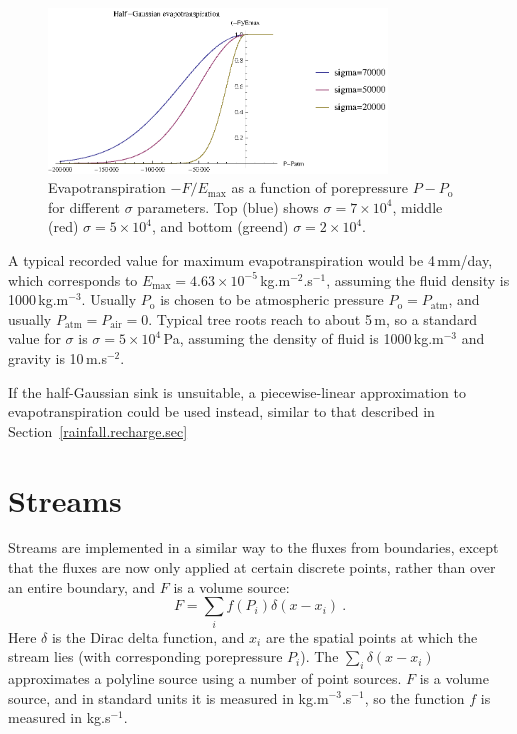 \documentclass[]{scrreprt}
\begin{document}
\begin{figure}[htb]
\centering
\includegraphics[width=9cm]{et.eps}
\caption{Evapotranspiration $-F/E_{\mathrm{max}}$ as a function of
  porepressure $P - P_{\mathrm{o}}$ for different $\sigma$ parameters.  Top (blue)
  shows $\sigma=7\times 10^{4}$, middle (red) $\sigma=5\times 10^{4}$,
  and bottom (greend) $\sigma=2\times 10^{4}$.}
\label{et.fig}
\end{figure}


A typical recorded value for maximum evapotranspiration would be
4\,mm/day, which corresponds to $E_{\mathrm{max}} = 4.63\times
10^{-5}$\,kg.m$^{-2}$.s$^{-1}$, assuming the fluid density is
1000\,kg.m$^{-3}$.  Usually $P_{\mathrm{o}}$ is chosen to be atmospheric
pressure $P_{\mathrm{o}} = P_{\mathrm{atm}}$, and usually $P_{\mathrm{atm}} =
P_{\mathrm{air}} = 0$.  Typical tree roots reach to
about 5\,m, so a standard value for $\sigma$ is $\sigma = 5\times
10^{4}$\,Pa, assuming the density of fluid
is 1000\,kg.m$^{-3}$ and gravity is 10\,m.s$^{-2}$.

If the half-Gaussian sink is unsuitable, a piecewise-linear
approximation to evapotranspiration could be used instead, similar to
that described in Section~\ref{rainfall.recharge.sec}


\section{Streams}

Streams are implemented in a similar way to the fluxes from
boundaries, except that the fluxes are now only
applied at certain discrete points, rather than over an entire
boundary, and $F$ is a volume source:
\begin{equation}
F = \sum_{i}f(P_{i})\delta(x - x_{i}) \ .
\label{source.stream.eqn}
\end{equation}
Here $\delta$ is the Dirac delta function, and $x_{i}$ are the spatial
points at which the stream lies (with corresponding porepressure
$P_{i}$).  The $\sum_{i}\delta(x-x_{i})$ approximates a polyline source
using a number of point sources.  $F$ is a volume source, and in
standard units it is measured in kg.m$^{-3}$.s$^{-1}$, so the function
$f$ is measured in kg.s$^{-1}$.
\end{document}
